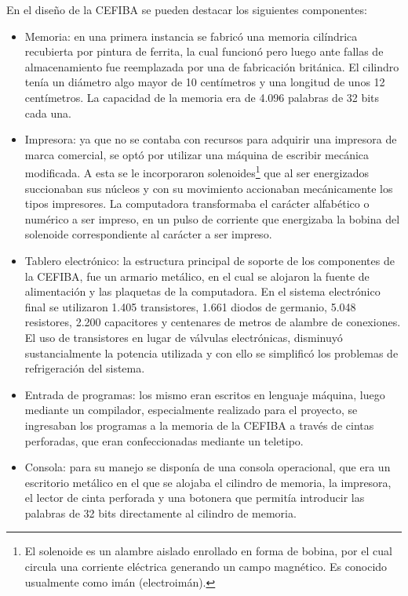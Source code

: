 \documentclass[%
  	final,
%
	notitlepage,
	narroweqnarray,
	inline,
 	twoside,
	]{ieee}
\begin{document}
\textbf{}

En el dise\~no de la CEFIBA se pueden destacar los siguientes componentes:\\

\begin{itemize}
\item Memoria: en una primera instancia se fabric\'o una memoria cil\'indrica recubierta por pintura de ferrita, la cual funcion\'o pero luego ante fallas de almacenamiento fue reemplazada por una de fabricaci\'on brit\'anica. El cilindro ten\'ia un di\'ametro algo mayor de 10 cent\'imetros y una longitud de unos 12 cent\'imetros. La capacidad de la memoria era de 4.096 palabras de 32 bits cada una.\\

\item Impresora: ya que no se contaba con recursos para adquirir una impresora de marca comercial, se opt\'o por utilizar una m\'aquina de escribir mec\'anica modificada. A esta se le incorporaron solenoides\footnote{El solenoide es un alambre aislado enrollado en forma de bobina, por el cual circula una corriente el\'ectrica generando un campo magn\'etico. Es conocido usualmente como im\'an (electroim\'an).} que al ser energizados succionaban sus n\'ucleos y con su movimiento accionaban mec\'anicamente los tipos impresores. La computadora transformaba el car\'acter alfab\'etico o num\'erico a ser impreso, en un pulso de corriente que energizaba la bobina del solenoide correspondiente al car\'acter a ser impreso.\\

\item Tablero electr\'onico: la estructura principal de soporte de los componentes de la CEFIBA, fue un armario met\'alico, en el cual se alojaron la fuente de alimentaci\'on y las plaquetas de la computadora. En el sistema electr\'onico final se utilizaron 1.405 transistores, 1.661 diodos de germanio, 5.048 resistores, 2.200 capacitores y centenares de metros de alambre de conexiones. El uso de transistores en lugar de v\'alvulas electr\'onicas, disminuy\'o sustancialmente la potencia utilizada y con ello se simplific\'o los problemas de refrigeraci\'on del sistema.\\

\item Entrada de programas: los mismo eran escritos en lenguaje m\'aquina, luego mediante un compilador, especialmente realizado para el proyecto, se ingresaban los programas a la memoria de la CEFIBA a trav\'es de cintas perforadas, que eran confeccionadas mediante un teletipo.\\

\item Consola: para su manejo se dispon\'ia de una consola operacional, que era un escritorio met\'alico en el que se alojaba el cilindro de memoria, la impresora, el lector de cinta perforada y una botonera que permit\'ia introducir las palabras de 32 bits directamente al cilindro de memoria.\\
\end{itemize}
\end{document}
